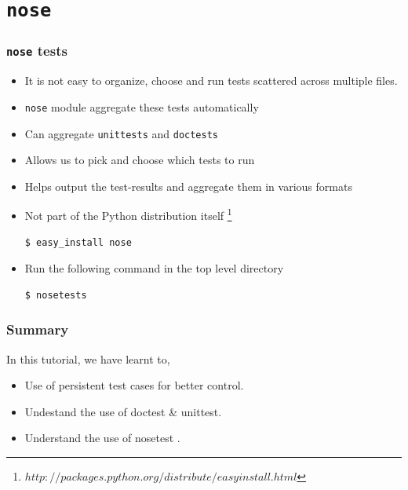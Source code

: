 \documentclass[12pt,presentation]{beamer}
\begin{document}
\section{\texttt{nose}}
\begin{frame}[fragile]
  \frametitle{\texttt{nose} tests}
  \begin{itemize}
  \item It is not easy to organize, choose and run tests scattered
    across multiple files. 
  \item \texttt{nose} module aggregate these tests automatically
  \item Can aggregate \texttt{unittests} and \texttt{doctests}
  \item Allows us to pick and choose which tests to run
  \item Helps output the test-results and aggregate them in various
    formats
  \item Not part of the Python distribution itself \footnote{$http://packages.python.org/distribute/easy$\textunderscore$install.html$}
\begin{lstlisting}
$ easy_install nose
\end{lstlisting} %
  \item Run the following command in the top level directory
\begin{lstlisting}
$ nosetests
\end{lstlisting} %
  \end{itemize}
\end{frame}

\begin{frame}
\frametitle{Summary}
\label{sec-8}

  In this tutorial, we have learnt to,


\begin{itemize}
\item Use of persistent test cases for better control.
\item Undestand the use of doctest \& unittest.
\item Understand the use of nosetest .

\end{itemize}
\end{frame}
\end{document}
